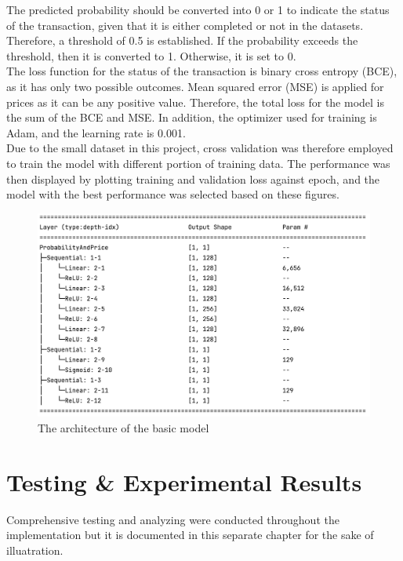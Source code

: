 \documentclass[12pt,twoside]{report}
\begin{document}
The predicted probability should be converted into 0 or 1 to indicate the status of the transaction, given that it is either completed or not in the datasets. Therefore, a threshold of 0.5 is established. If the probability exceeds the threshold, then it is converted to 1. Otherwise, it is set to 0.
\\

The loss function for the status of the transaction is binary cross entropy (BCE), as it has only two possible outcomes. Mean squared error (MSE) is applied for prices as it can be any positive value. Therefore, the total loss for the model is the sum of the BCE and MSE. In addition, the optimizer used for training is Adam, and the learning rate is 0.001. 
\\ 

Due to the small dataset in this project, cross validation was therefore employed to train the model with different portion of training data. The performance was then displayed by plotting training and validation loss against epoch, and the model with the best performance was selected based on these figures. 

\begin{figure}[h]
	\centering
	\includegraphics[width=1\linewidth]{basic_model_layout}
	\caption{The architecture of the basic model}
	\label{basic_model_layout}
\end{figure}


\chapter{Testing \& Experimental Results}
Comprehensive testing and analyzing were conducted throughout the implementation but it is documented in this separate chapter for the sake of illuatration. 
\end{document}
